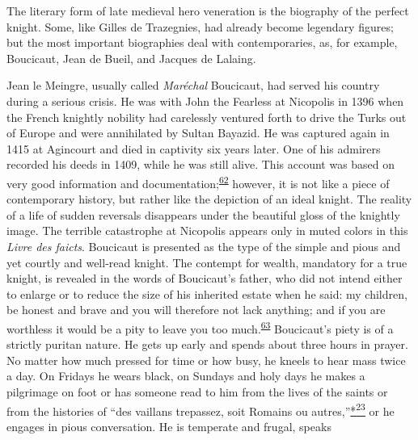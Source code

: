 The literary form of late medieval hero veneration is the biography of
the perfect knight. Some, like Gilles de Trazegnies, had already become
legendary figures; but the most important biographies deal with
contemporaries, as, for example, Boucicaut, Jean de Bueil, and Jacques
de Lalaing.

Jean le Meingre, usually called \emph{Maréchal} Boucicaut, had served
his country during a serious crisis. He was with John the Fearless at
Nicopolis in 1396 when the French knightly nobility had carelessly
ventured forth to drive the Turks out of Europe and were annihilated by
Sultan Bayazid. He was captured again in 1415 at Agincourt and died in
captivity six years later. One of his admirers recorded his deeds in
1409, while he was still alive. This account was based on very good
information and
documentation;\textsuperscript{\protect\hypertarget{10_Chapter_Three__THE_HEROIC_DREAM.xhtmlux5cux23id_1809}{\protect\hyperlink{23_NOTES.xhtmlux5cux23id_1810}{62}}}
however, it is not like a piece of contemporary history, but rather like
the depiction of an ideal knight. The reality of a life of sudden
reversals disappears under the beautiful gloss of the knightly image.
The terrible catastrophe at Nicopolis appears only in muted colors in
this \emph{Livre des faicts}. Boucicaut is presented as the type of the
simple and pious and yet courtly and well-read knight. The contempt for
wealth, mandatory for a true knight, is revealed in the words of
Boucicaut's father, who did not intend either to enlarge or to reduce
the size of his inherited estate when he said: my children, be honest
and brave and you will therefore not lack anything; and if you are
worthless it would be a pity to leave you too
much.\textsuperscript{\protect\hypertarget{10_Chapter_Three__THE_HEROIC_DREAM.xhtmlux5cux23id_1807}{\protect\hyperlink{23_NOTES.xhtmlux5cux23id_1808}{63}}}
Boucicaut's piety is of a strictly puritan nature. He gets up early and
spends about three hours in prayer. No matter how much pressed for time
or how busy, he kneels to hear mass twice a day. On Fridays he wears
black, on Sundays and holy days he makes a pilgrimage on
\protect\hypertarget{10_Chapter_Three__THE_HEROIC_DREAM.xhtmlux5cux23page_79}{}{}foot
or has someone read to him from the lives of the saints or from the
histories of ``des vaillans trepassez, soit Romains ou
autres,''\protect\hypertarget{10_Chapter_Three__THE_HEROIC_DREAM.xhtmlux5cux23id_2507}{\protect\hyperlink{23_NOTES.xhtmlux5cux23id_2508}{*\textsuperscript{23}}}
or he engages in pious conversation. He is temperate and frugal, speaks

